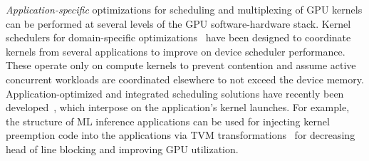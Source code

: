 \emph{Application-specific} optimizations for scheduling and multiplexing of GPU kernels can be performed at several levels of the GPU software-hardware stack. 
Kernel schedulers for domain-specific optimizations~\cite{strati2024orion,chen2017effisha,kim2020navigator,gu2023fast} have been designed to coordinate kernels from several applications to improve on device scheduler performance.
These operate only on compute kernels to prevent contention and assume active concurrent workloads are coordinated elsewhere to not exceed the device memory. 
Application-optimized and integrated scheduling solutions have recently been developed~\cite{ng2023paella,pemberton2022kernel,strati2024orion}, which interpose on the application's kernel launches.
For example, the structure of ML inference applications can be used for injecting kernel preemption code into the applications via TVM transformations~\cite{han2022microsecond} for decreasing head of line blocking and improving GPU utilization.




